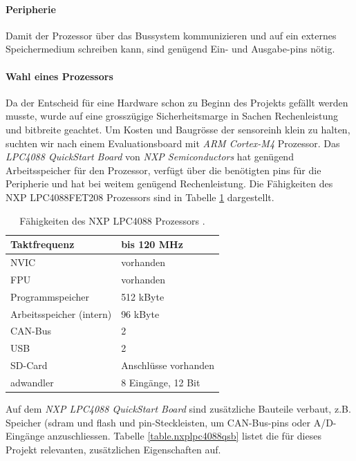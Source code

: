 \paragraph{Peripherie} Damit der Prozessor über das Bussystem kommunizieren und auf ein externes Speichermedium schreiben kann, sind genügend Ein- und Ausgabe-\glspl{pin} nötig.

\paragraph{Wahl eines Prozessors} Da der Entscheid für eine Hardware schon zu Beginn des Projekts gefällt werden musste, wurde auf eine grosszügige Sicherheitsmarge in Sachen Rechenleistung und \gls{bitbreite} geachtet.  Um Kosten und Baugrösse der \gls{sensoreinh} klein zu halten, suchten wir nach einem Evaluationsboard mit \emph{ARM Cortex-M4} Prozessor. Das \emph{LPC4088 QuickStart Board} von \emph{NXP Semiconductors} hat genügend Arbeitsspeicher für den Prozessor, verfügt über die benötigten \glspl{pin} für die Peripherie und hat bei weitem genügend Rechenleistung. Die Fähigkeiten des NXP LPC4088FET208 Prozessors sind in Tabelle \ref{table.lpc4088} dargestellt. 

\begin{table}
\begin{center}
\begin{tabular}{|l|l|}
\hline
Taktfrequenz & bis 120 MHz \\
\hline
NVIC & vorhanden \\
\hline
FPU & vorhanden \\
\hline
Programmspeicher & 512 kByte \\
\hline
Arbeitsspeicher (intern) & 96 kByte \\
\hline
CAN-Bus & 2 \\
\hline
USB & 2 \\
\hline
SD-Card & Anschlüsse vorhanden \\
\hline
\gls{adwandler} & 8 Eingänge, 12 Bit \\
\hline
\end{tabular}
\caption{Fähigkeiten des NXP LPC4088 Prozessors \cite{nxplpc4088}.}
\label{table.lpc4088}
\end{center}
\end{table}

Auf dem \emph{NXP LPC4088 QuickStart Board} sind zusätzliche Bauteile verbaut, z.B. Speicher (\gls{sdram} und \gls{flash} und \gls{pin}-Steckleisten, um CAN-Bus-\glspl{pin} oder A/D-Eingänge anzuschliessen. Tabelle \ref{table.nxplpc4088qsb} listet die für dieses Projekt relevanten, zusätzlichen Eigenschaften auf.

